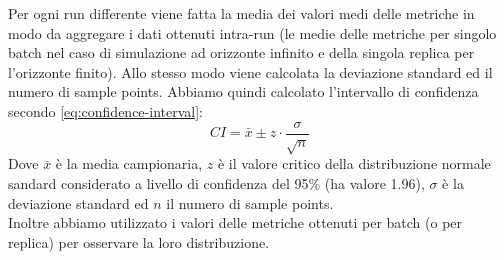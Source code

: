 Per ogni run differente viene fatta la media dei valori medi delle metriche in modo da aggregare i dati ottenuti intra-run (le medie delle metriche per singolo batch nel caso di simulazione ad orizzonte infinito e della singola replica per l'orizzonte finito). Allo stesso modo viene calcolata la deviazione standard ed il numero di sample points. Abbiamo quindi calcolato l'intervallo di confidenza secondo \autoref{eq:confidence-interval}:
\begin{equation}
    CI = \bar{x} \pm z \cdot \frac{\sigma}{\sqrt{n}}
    \label{eq:confidence-interval}
\end{equation}
Dove $\bar{x}$ è la media campionaria, $z$ è il valore critico della distribuzione normale sandard considerato a livello di confidenza del 95\% (ha valore 1.96), $\sigma$ è la deviazione standard ed $n$ il numero di sample points.\\
Inoltre abbiamo utilizzato i valori delle metriche ottenuti per batch (o per replica) per osservare la loro distribuzione.